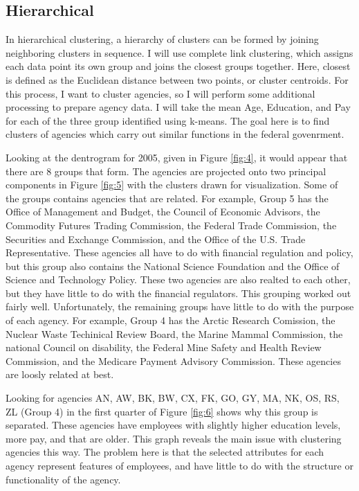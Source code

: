 \documentclass{article}
\begin{document}
    \subsection{Hierarchical}
    In hierarchical clustering, a hierarchy of clusters can be formed by joining neighboring clusters in sequence. I will use complete link clustering, which assigns each data point its own group and joins the closest groups together. Here, closest is defined as the Euclidean distance between two points, or cluster centroids. For this process, I want to cluster agencies, so I will perform some additional processing to prepare agency data. I will take the mean Age, Education, and Pay for each of the three group identified using k-means. The goal here is to find clusters of agencies which carry out similar functions in the federal govenrment.
    \par
    Looking at the dentrogram for 2005, given in Figure \ref{fig:4}, it would appear that there are 8 groups that form. The agencies are projected onto two principal components in Figure \ref{fig:5} with the clusters drawn for visualization. Some of the groups contains agencies that are related. For example, Group 5 has the Office of Management and Budget, the Council of Economic Advisors, the Commodity Futures Trading Commission, the Federal Trade Commission, the Securities and Exchange Commission, and the Office of the U.S. Trade Representative. These agencies all have to do with financial regulation and policy, but this group also contains the National Science Foundation and the Office of Science and Technology Policy. These two agencies are also realted to each other, but they have little to do with the financial regulators. This grouping worked out fairly well. Unfortunately, the remaining groups have little to do with the purpose of each agency. For example, Group 4 has the Arctic Research Comission, the Nuclear Waste Techinical Review Board, the Marine Mammal Commission, the national Council on disability, the Federal Mine Safety and Health Review Commission, and the Medicare Payment Advisory Commission. These agencies are loosly related at best.
    \par
    Looking for agencies AN, AW, BK, BW, CX, FK, GO, GY, MA, NK, OS, RS, ZL (Group 4) in the first quarter of Figure \ref{fig:6} shows why this group is separated. These agencies have employees with slightly higher education levels, more pay, and that are older. This graph reveals the main issue with clustering agencies this way. The problem here is that the selected attributes for each agency represent features of employees, and have little to do with the structure or functionality of the agency.
\end{document}
